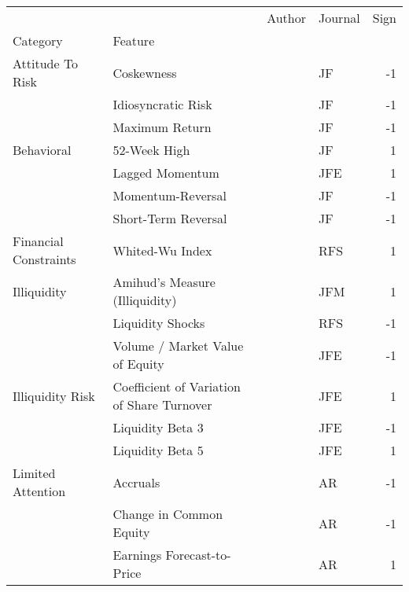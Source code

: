 \begin{tabular}{llllr}
\toprule
             &                                  &                             Author & Journal &  Sign \\
Category & Feature &                                    &         &       \\
\midrule
Attitude To Risk & Coskewness &       \cite{harvey2000conditional} &      JF &    -1 \\
             & Idiosyncratic Risk &                \cite{ang2006cross} &      JF &    -1 \\
             & Maximum Return &              \cite{bali2011maxing} &      JF &    -1 \\
Behavioral & 52-Week High &                \cite{george200452} &      JF &     1 \\
             & Lagged Momentum &            \cite{novy2012momentum} &     JFE &     1 \\
             & Momentum-Reversal &        \cite{jegadeesh1993returns} &      JF &    -1 \\
             & Short-Term Reversal &       \cite{jegadeesh1990evidence} &      JF &    -1 \\
Financial Constraints & Whited-Wu Index &         \cite{whited2006financial} &     RFS &     1 \\
Illiquidity & Amihud's Measure (Illiquidity) &       \cite{amihud2002illiquidity} &     JFM &     1 \\
             & Liquidity Shocks &           \cite{bali2013liquidity} &     RFS &    -1 \\
             & Volume / Market Value of Equity &       \cite{haugen1996commonality} &     JFE &    -1 \\
Illiquidity Risk & Coefficient of Variation of Share Turnover &          \cite{chordia2001trading} &     JFE &     1 \\
             & Liquidity Beta 3 &            \cite{acharya2005asset} &     JFE &    -1 \\
             & Liquidity Beta 5 &            \cite{acharya2005asset} &     JFE &     1 \\
Limited Attention & Accruals &             \cite{sloan1996create} &      AR &    -1 \\
             & Change in Common Equity &  \cite{richardson2006implications} &      AR &    -1 \\
             & Earnings Forecast-to-Price &           \cite{elgers2001delayed} &      AR &     1 \\

\end{tabular}
